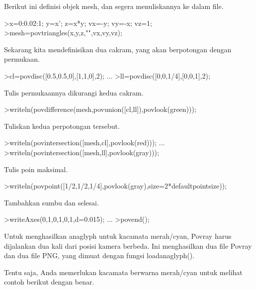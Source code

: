 \documentclass{article}
\begin{document}
\begin{eulernotebook}
\begin{eulercomment}
Berikut ini definisi objek mesh, dan segera menuliskannya ke dalam
file.
\end{eulercomment}
\begin{eulerprompt}
>x=0:0.02:1; y=x'; z=x*y; vx=-y; vy=-x; vz=1;
>mesh=povtriangles(x,y,z,"",vx,vy,vz);
\end{eulerprompt}
\begin{eulercomment}
Sekarang kita mendefinisikan dua cakram, yang akan berpotongan dengan
permukaan.
\end{eulercomment}
\begin{eulerprompt}
>cl=povdisc([0.5,0.5,0],[1,1,0],2); ...
>ll=povdisc([0,0,1/4],[0,0,1],2);
\end{eulerprompt}
\begin{eulercomment}
Tulis permukaannya dikurangi kedua cakram.
\end{eulercomment}
\begin{eulerprompt}
>writeln(povdifference(mesh,povunion([cl,ll]),povlook(green)));
\end{eulerprompt}
\begin{eulercomment}
Tuliskan kedua perpotongan tersebut.
\end{eulercomment}
\begin{eulerprompt}
>writeln(povintersection([mesh,cl],povlook(red))); ...
>writeln(povintersection([mesh,ll],povlook(gray)));
\end{eulerprompt}
\begin{eulercomment}
Tulis poin maksimal.
\end{eulercomment}
\begin{eulerprompt}
>writeln(povpoint([1/2,1/2,1/4],povlook(gray),size=2*defaultpointsize));
\end{eulerprompt}
\begin{eulercomment}
Tambahkan sumbu dan selesai.
\end{eulercomment}
\begin{eulerprompt}
>writeAxes(0,1,0,1,0,1,d=0.015); ...
>povend();
\end{eulerprompt}
\begin{eulercomment}
Untuk menghasilkan anaglyph untuk kacamata merah/cyan, Povray harus
dijalankan dua kali dari posisi kamera berbeda. Ini menghasilkan dua
file Povray dan dua file PNG, yang dimuat dengan fungsi
loadanaglyph().

Tentu saja, Anda memerlukan kacamata berwarna merah/cyan untuk melihat
contoh berikut dengan benar.


\end{eulercomment}
\end{eulernotebook}
\end{document}
